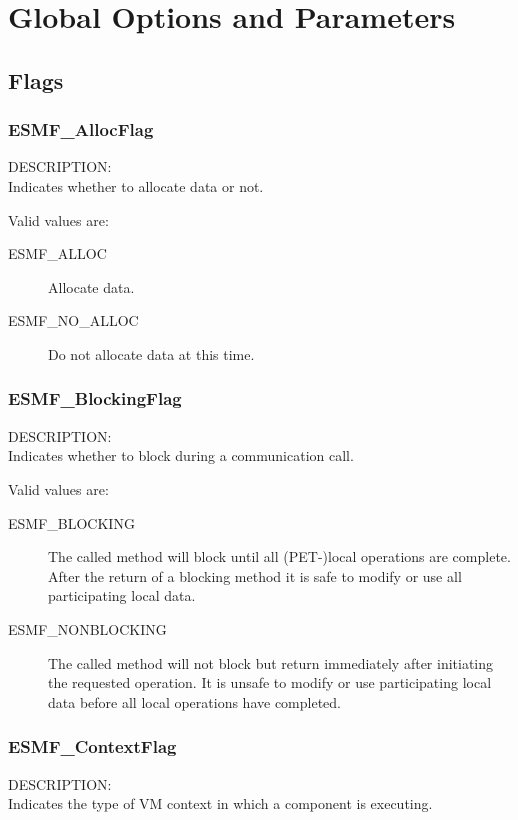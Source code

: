 
\section{Global Options and Parameters}

\subsection{Flags}

\subsubsection{ESMF\_AllocFlag}
\label{opt:allocflag}
{\sf DESCRIPTION:\\}  
Indicates whether to allocate data or not.

Valid values are:
\begin{description}
\item [ESMF\_ALLOC]
      Allocate data. 
\item [ESMF\_NO\_ALLOC]
      Do not allocate data at this time. 
\end{description}

\subsubsection{ESMF\_BlockingFlag}
\label{opt:blockingflag}
{\sf DESCRIPTION:\\}  
Indicates whether to block during a communication call.

Valid values are:
\begin{description}

\item [ESMF\_BLOCKING]
         The called method will block until all (PET-)local operations are 
         complete. After the return of a blocking method it is safe to modify
         or use all participating local data.
\item [ESMF\_NONBLOCKING]
         The called method will not block but return immediately after
         initiating the requested operation. It is unsafe to modify
         or use participating local data before all local operations have     
         completed.

\end{description}

\subsubsection{ESMF\_ContextFlag}
\label{opt:contextflag}
{\sf DESCRIPTION:\\}  
Indicates the type of VM context in which a component is executing.

